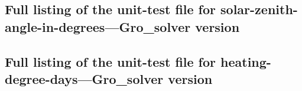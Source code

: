 \documentclass{article}\usepackage[]{graphicx}\usepackage[]{color}
\begin{document}
\begin{appendices}


\subsection{Full listing of the unit-test file for solar-zenith-angle-in-degrees---Gro\_solver version} \label{szags test file}



\subsection{Full listing of the unit-test file for heating-degree-days---Gro\_solver version} \label{hddgs test file}



\end{appendices}
\end{document}
